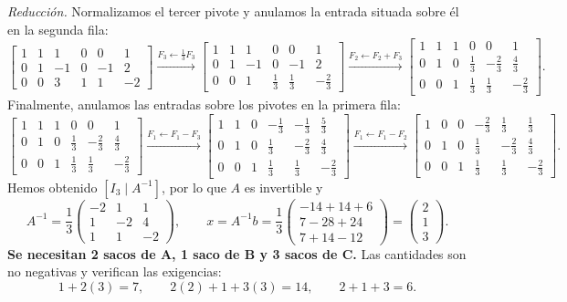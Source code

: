\documentclass[10pt,a4]{examenEPN0}
\begin{document}
\noindent\textit{Reducción.} Normalizamos el tercer pivote y anulamos
la entrada situada sobre él en la segunda fila:
\[
    \left[\begin{array}{ccc|ccc}
        1&1&1&0&0&1\\0&1&-1&0&-1&2\\0&0&3&1&1&-2
    \end{array}\right]
    \xrightarrow{F_3\leftarrow \frac13 F_3}
    \left[\begin{array}{ccc|ccc}
        1&1&1&0&0&1\\0&1&-1&0&-1&2\\0&0&1&\frac13&\frac13&-\frac23
    \end{array}\right]
    \xrightarrow{F_2\leftarrow F_2+F_3}
    \left[\begin{array}{ccc|ccc}
        1&1&1&0&0&1\\0&1&0&\frac13&-\frac23&\frac43\\0&0&1&\frac13&\frac13&-\frac23
    \end{array}\right].
\]
Finalmente, anulamos las entradas sobre los pivotes en la primera fila:
\[
    \left[\begin{array}{ccc|ccc}
        1&1&1&0&0&1\\0&1&0&\frac13&-\frac23&\frac43\\0&0&1&\frac13&\frac13&-\frac23
    \end{array}\right]
    \xrightarrow{F_1\leftarrow F_1-F_3}
    \left[\begin{array}{ccc|ccc}
        1&1&0&-\frac13&-\frac13&\frac53\\0&1&0&\frac13&-\frac23&\frac43\\0&0&1&\frac13&\frac13&-\frac23
    \end{array}\right]
    \xrightarrow{F_1\leftarrow F_1-F_2}
    \left[\begin{array}{ccc|ccc}
        1&0&0&-\frac23&\frac13&\frac13\\0&1&0&\frac13&-\frac23&\frac43\\0&0&1&\frac13&\frac13&-\frac23
    \end{array}\right].
\]
Hemos obtenido $[I_3\mid A^{-1}]$, por lo que $A$ es invertible y
\[
    A^{-1}=\frac{1}{3}\begin{pmatrix}-2&1&1\\1&-2&4\\1&1&-2\end{pmatrix},
    \qquad
    x=A^{-1}b=\frac{1}{3}
    \begin{pmatrix}-14+14+6\\7-28+24\\7+14-12\end{pmatrix}
    =\begin{pmatrix}2\\1\\3\end{pmatrix}.
\]
\textbf{Se necesitan 2 sacos de A, 1 saco de B y 3 sacos de C.}
Las cantidades son no negativas y verifican las exigencias:
\[
    1+2(3)=7,\qquad 2(2)+1+3(3)=14,\qquad 2+1+3=6.
\]
\end{document}
